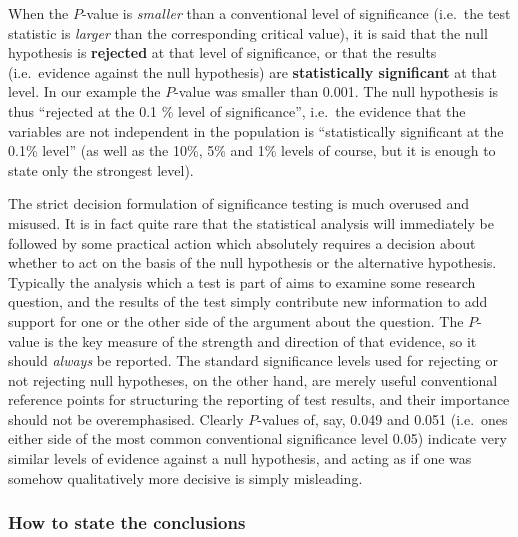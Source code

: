 When the $P$-value is \emph{smaller} than a conventional level of
significance (i.e.\ the test statistic is \emph{larger} than the
corresponding critical value), it is said that the null hypothesis is
\textbf{rejected} at that level of significance, or that the results
(i.e.\ evidence against the null hypothesis) are \textbf{statistically
significant} at that level. In our example the $P$-value was smaller
than 0.001. The null hypothesis is thus ``rejected at the 0.1 \% level of
significance'', i.e.\ the evidence that the variables are not
independent in the population is ``statistically significant at the
0.1\% level'' (as well as the 10\%, 5\% and 1\% levels of course, but it
is enough to state only the strongest level).

The strict decision formulation of significance testing is much overused
and misused. It is in fact quite rare that the statistical analysis will
immediately be followed by some practical action which absolutely
requires a decision about whether to act on the basis of the null
hypothesis or the alternative hypothesis. Typically the analysis which a
test is part of aims to examine some research question, and the results
of the test simply contribute new information to add support for one or
the other side of the argument about the question. The $P$-value is the
key measure of the strength and direction of that evidence, so it should
\emph{always} be reported. The standard significance levels used for
rejecting or not rejecting null hypotheses, on the other hand, are
merely useful conventional reference points for structuring the
reporting of test results, and their importance should not be
overemphasised. Clearly $P$-values of, say, 0.049 and 0.051 (i.e.\ ones
either side of the most common conventional significance level 0.05)
indicate very similar levels of evidence against a null hypothesis, and
acting as if one was somehow qualitatively more decisive is simply
misleading.

\subsubsection{How to state the conclusions}

